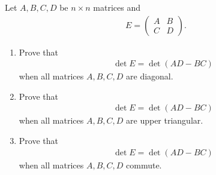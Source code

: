 \documentclass[12pt]{article}
\begin{document}
\medskip

Let $A, B, C, D$ be $n \times n$ matrices and
\begin{align*}
    E = \begin{pmatrix}
        A & B \\
        C & D
    \end{pmatrix}.
\end{align*}
\begin{enumerate}[label=(\alph*)]
    \item Prove that
    \begin{align*}
        \det E = \det (AD - BC)
    \end{align*}
    when all matrices $A, B, C, D$ are diagonal.

    \item Prove that
    \begin{align*}
        \det E = \det (AD - BC)
    \end{align*}
    when all matrices $A, B, C, D$ are upper triangular.

    \item Prove that
    \begin{align*}
        \det E = \det (AD - BC)
    \end{align*}
    when all matrices $A, B, C, D$ commute.
\end{enumerate}
\end{document}
